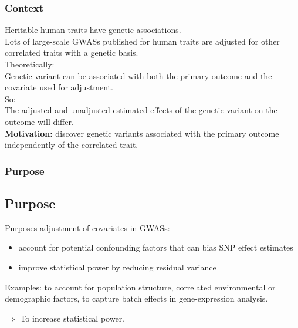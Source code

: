 \documentclass{beamer}
\begin{document}
\begin{frame}
\frametitle{Context}

Heritable human traits have genetic associations.\\\vspace{0.3cm}
Lots of large-scale GWASs published for human traits are adjusted for other correlated traits with a genetic basis. \\
\vspace{0.5cm}
Theoretically:\\
\hspace{0.5cm}Genetic variant can  be associated with both the primary outcome and the covariate used for adjustment.\\\vspace{0.5cm}
So:\\
\hspace{0.5cm}The adjusted and unadjusted estimated effects of the genetic variant on the outcome will differ.\\\vspace{0.5cm}
\textbf{Motivation:} discover genetic variants associated with the primary outcome independently of the correlated trait. \\




\end{frame}


\begin{frame}
\frametitle{Purpose}
\subsection{Purpose}
Purposes adjustment of covariates in GWASs: 
\begin{itemize}
\item account for potential confounding factors that can bias SNP effect estimates
\item improve statistical power by reducing residual variance
\end{itemize}
\vspace{0.5cm}


Examples: to account for population structure, correlated environmental or demographic factors, to capture batch effects in gene-expression analysis.\\
\vspace{0.5cm}

$\Longrightarrow$ To increase statistical power.\\

\end{frame}
\end{document}
